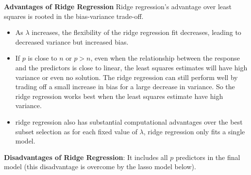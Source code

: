 \documentclass[11pt]{article}
\begin{document}
\noindent \textbf{Advantages of Ridge Regression}
\noindent Ridge regression's advantage over least squares is rooted in the bias-variance trade-off.
\begin{itemize}
    \item As $\lambda$ increases, the flexibility of the ridge regression fit decreases, leading to decreased variance but increased bias.
    \item If $p$ is close to $n$ or $p > n$, even when the relationship between the response and the predictors is close to linear, the least squares estimates will have high variance or even no solution. The ridge regression can still perform well by trading off a small increase in bias for a large decrease in variance. So the ridge regression works best when the least squares estimate have high variance.
    \item ridge regression also has substantial computational advantages over the best subset selection as for each fixed value of $\lambda$, ridge regression only fits a single model.
\end{itemize} \phantom{i}

\noindent \textbf{Disadvantages of Ridge Regression}: It includes all $p$ predictors in the final model (this disadvantage is overcome by the lasso model below).
\end{document}
